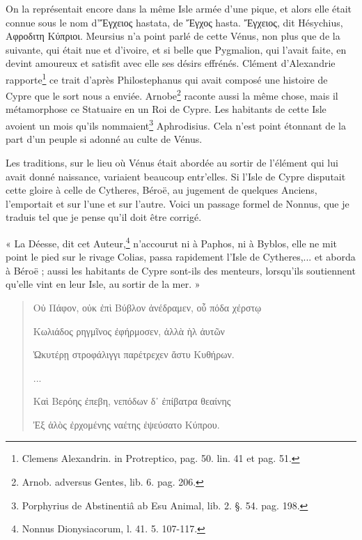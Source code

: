 \documentclass[a4paper, 11pt, oneside, polutonikogreek, french]{article}
\begin{document}
On la représentait encore dans la même Isle armée d'une pique, et alors elle était connue sous le nom d'Ἔγχειος hastata, de Ἔγχος hasta. Ἔγχειος, dit Hésychius, Αφροδιτη Κύπριοι. Meursius n'a point parlé de cette Vénus, non plus que de la suivante, qui était nue et d'ivoire, et si belle que Pygmalion, qui l'avait faite, en devint amoureux et satisfit avec elle ses désirs effrénés. Clément d'Alexandrie rapporte\footnote{Clemens Alexandrin. in Protreptico, pag. 50. lin. 41 et pag. 51.} ce trait d'après Philostephanus qui avait composé une histoire de Cypre que le sort nous a enviée. Arnobe\footnote{Arnob. adversus Gentes, lib. 6. pag. 206.} raconte aussi la même chose, mais il métamorphose ce Statuaire en un Roi de Cypre. Les habitants de cette Isle avoient un mois qu'ils nommaient\footnote{Porphyrius de Abstinentiâ ab Esu Animal, lib. 2. §. 54. pag. 198.} Aphrodisius. Cela n'est point étonnant de la part d'un peuple si adonné au culte de Vénus.

Les traditions, sur le lieu où Vénus était abordée au sortir de l'élément qui lui avait donné naissance, variaient beaucoup entr'elles. Si l'Isle de Cypre disputait cette gloire à celle de Cytheres, Béroë, au jugement de quelques Anciens, l'emportait et sur l'une et sur l'autre. Voici un passage formel de Nonnus, que je traduis tel que je pense qu'il doit être corrigé.

« La Déesse, dit cet Auteur,\footnote{Nonnus Dionysiacorum, l. 41. 5. 107-117.} n'accourut ni à Paphos, ni à Byblos, elle ne mit point le pied sur le rivage Colias, passa rapidement l'Isle de Cytheres,... et aborda à Béroë ; aussi les habitants de Cypre sont-ils des menteurs, lorsqu'ils soutiennent qu'elle vint en leur Isle, au sortir de la mer. »
\begin{quotation}
Οὐ Πάφον, οὐκ ἐπὶ Βύβλον ἀνέδραμεν, οὗ πόδα χέρστῳ

Κωλιάδος ρηγμῖνος ἐφήρμοσεν, ἀλλὰ ὴλ ἀυτῶν

Ὠκυτέρῃ στροφάλιγγι παρέτρεχεν ἄστυ Κυθήρων.

...

Καὶ Βερόης ἐπεβη, νεπόδων δ᾽ ἐπίβατρα θεαίνης

Ἐξ ἁλὸς ἐρχομένης ναέτης ἐψεύσατο Κύπρου.
\end{quotation}
\end{document}
